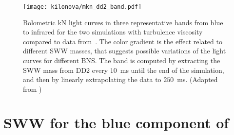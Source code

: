 
\begin{figure}[t]
    \centering
    \texttt{[image: kilonova/mkn\_dd2\_band.pdf]}
    \caption{Bolometric kN light curves in three representative bands from blue to
        infrared for the two simulations with turbulence viscosity compared to
        \AT{} data from~\citep{Villar:2017wcc}.
        The color gradient is the effect related to different
        \ac{SWW} masses, that suggests possible variations of the light
        curves for different \ac{BNS}. The band is computed by extracting the
        \ac{SWW} mass from DD2 every $10$~ms until the end of the simulation, and
        then by linearly extrapolating the data to $250$~ms.
        (Adapted from \citet{Nedora:2019jhl})
    }
    \label{fig:knlc}
\end{figure}


\section{\ac{SWW} for the blue component of \AT{}}\label{sec:kilonova:result}

